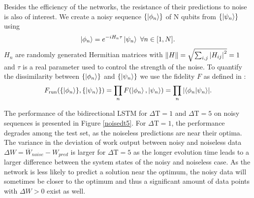 Besides the efficiency of the networks, the resistance of their predictions to noise is also of interest.
We create a noisy sequence $\{\ket{\phi_n}\}$ of N qubits from $\{\ket{\psi_n}\}$ using
\begin{align*}
	\ket{\phi_n} = e^{-i H_n \tau} \ket{\psi_n} \ \forall n \in [1, N].
\end{align*}
$H_n$ are randomly generated Hermitian matrices with $\norm{H} = \sqrt{\sum_{i,j} \abs{H_{ij}}^2} = 1$ and $\tau$ is a real parameter used to control the strength of the noise.
To quantify the dissimilarity between $\{\ket{\phi_n}\}$ and $\{\ket{\psi_n}\}$ we use the fidelity $F$ as defined in \cite{10.5555/1972505}:
\begin{align*}
	F_{\text{run}}(\{\ket{\phi_n}\}, \{\ket{\psi_n}\}) = \prod_n F(\ket{\phi_n}, \ket{\psi_n}) = \prod_n \abs{\bra{\phi_n}\ket{\psi_n}}.
\end{align*}

The performance of the bidirectional LSTM for $\Delta \mathrm{T} = 1$ and $\Delta \mathrm{T} = 5$ on noisy sequences is presented in Figure \ref{noisedt5}.
For $\Delta \mathrm{T} = 1$, the performance degrades among the test set, as the noiseless predictions are near their optima.
The variance in the deviation of work output between noisy and noiseless data $\Delta W = \overline{W}_{noise} - W_{pred}$ is larger for $\Delta \mathrm{T} = 5$ as the longer evolution time leads to a larger difference between the system states of the noisy and noiseless case.
As the network is less likely to predict a solution near the optimum, the noisy data will sometimes be closer to the optimum and thus a significant amount of data points with $\Delta W > 0$ exist as well.

